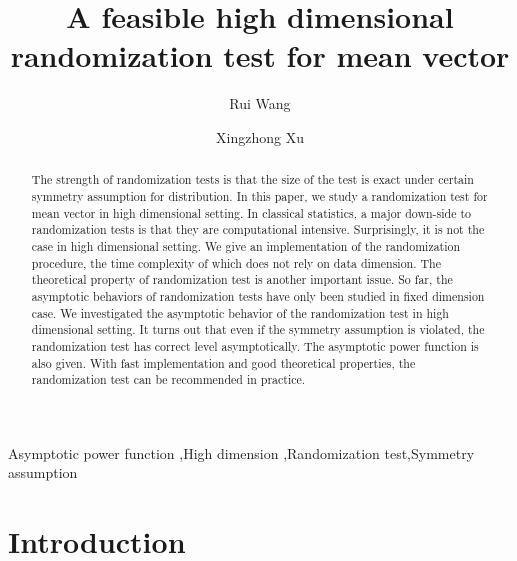 \documentclass[review]{elsarticle}
\theoremstyle{plain}
\theoremstyle{definition}
\theoremstyle{remark}
\begin{document}
\begin{frontmatter}

\title{A feasible high dimensional randomization test for mean vector}

    \author[mymainaddress]{Rui Wang}
    \author[mymainaddress,mysecondaryaddress]{Xingzhong Xu}
    \address[mymainaddress]{School of Mathematics and Statistics, Beijing Institute of Technology, Beijing 
    100081,China}
    \address[mysecondaryaddress]{Beijing Key Laboratory on MCAACI, Beijing Institute of Technology, Beijing 100081,China}
    
    
\begin{abstract}
    The strength of randomization tests is that the size of the test is exact under certain symmetry assumption for distribution.
    In this paper, we study a randomization test for mean vector in high dimensional setting. 
    In classical statistics, a major down-side to randomization tests is that they are computational intensive.    
    Surprisingly, it is not the case in high dimensional setting.
    We give an implementation of the randomization procedure, the time complexity of which does not rely on data dimension. 
    The theoretical property of randomization test is another important issue.
    So far, the asymptotic behaviors of randomization tests have only been studied in fixed dimension case.
    We investigated the asymptotic behavior of the randomization test in high dimensional setting.
    It turns out that even if the symmetry assumption is violated, the randomization test has correct level asymptotically.
    The asymptotic power function is also given.
    With fast implementation and good theoretical properties, the randomization test can be recommended in practice.
\end{abstract}

\begin{keyword}
    Asymptotic power function \sep High dimension \sep Randomization test\sep Symmetry assumption 
\end{keyword}

\end{frontmatter}



\section{Introduction}
\end{document}
